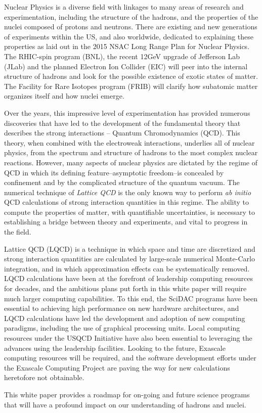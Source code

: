 
Nuclear Physics is a diverse field with linkages to many areas of
research and experimentation, including the structure of the hadrons,
and the properties of the nuclei composed of protons and neutrons.
There are existing and new generations of experiments within the US,
and also worldwide, dedicated to explaining these properties as laid
out in the 2015 NSAC Long Range Plan for Nuclear Physics.  The
RHIC-spin program (BNL), the recent
12GeV upgrade of Jefferson Lab (JLab) and the planned Electron Ion
Collider (EIC) will peer into the internal structure of hadrons and
look for the possible existence of exotic states of matter. The
Facility for Rare Isotopes program (FRIB) will clarify how subatomic
matter organizes itself and how nuclei emerge.

Over the years, this impressive level of experimentation has provided
numerous discoveries that have led to the development of the
fundamental theory that describes the strong interactions -- Quantum
Chromodynamics (QCD). This theory, when combined with the electroweak
interactions, underlies all of nuclear physics, from the spectrum and
structure of hadrons to the most complex nuclear reactions. However,
many aspects of nuclear physics are dictated by the regime of QCD in
which its defining feature--asymptotic freedom--is concealed by
confinement and by the complicated structure of the quantum
vacuum. The numerical technique of {\it Lattice QCD} is the only known
way to perform {\it ab initio} QCD calculations of strong interaction
quantities in this regime. The ability to compute the properties of
matter, with quantifiable uncertainties, is necessary to establishing
a bridge between theory and experiments, and vital to progress in the
field.  

Lattice QCD (LQCD) is a technique in which space and time are
discretized and strong interaction quantities are calculated by
large-scale numerical Monte-Carlo integration, and in which
approximation effects can be systematically removed. LQCD calculations
have been at the forefront of leadership computing resources for
decades, and the ambitious plans put forth in this white paper will
require much larger computing capabilities. To this end, the SciDAC
programs have been essential to achieving high performance on new hardware
architectures, and LQCD calculations have led the development and
adoption of new computing paradigms, including the use of graphical
processing units. Local computing resources under the USQCD Initiative
have also been essential to leveraging the advances using the
leadership facilities. Looking to the future, Exascale computing resources
will be required, and the software development efforts under the
Exascale Computing Project are paving the way for new calculations
heretofore not obtainable.


This white paper provides a roadmap for on-going and future science
programs that will have a profound impact on our understanding of hadrons and nuclei.

